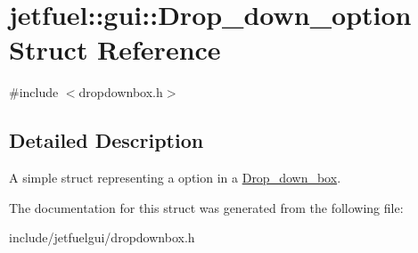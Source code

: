 \hypertarget{structjetfuel_1_1gui_1_1Drop__down__option}{}\section{jetfuel\+:\+:gui\+:\+:Drop\+\_\+down\+\_\+option Struct Reference}
\label{structjetfuel_1_1gui_1_1Drop__down__option}


{\ttfamily \#include $<$dropdownbox.\+h$>$}



\subsection{Detailed Description}
A simple struct representing a option in a \hyperlink{classjetfuel_1_1gui_1_1Drop__down__box}{Drop\+\_\+down\+\_\+box}. 

The documentation for this struct was generated from the following file\+:\begin{DoxyCompactItemize}
\item 
include/jetfuelgui/dropdownbox.\+h\end{DoxyCompactItemize}
